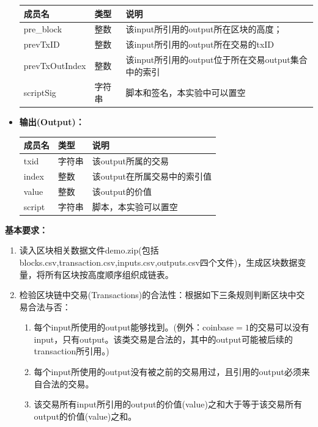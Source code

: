 \documentclass[10pt,a4paper]{article}
\begin{document}
\begin{itemize}
        \begin{table}[H]
            \centering
            \begin{tabular}{|l|l|l|}
            \hline
                成员名 & 类型 & 说明 \\ \hline
                pre\_block & 整数 & 该input所引用的output所在区块的高度；  \\ \hline
                prevTxID & 整数 & 该input所引用的output所在交易的txID \\ \hline
                prevTxOutIndex & 整数 & 该input所引用的output位于所在交易output集合中的索引 \\ \hline
                scriptSig & 字符串 & 脚本和签名，本实验中可以置空 \\ \hline
            \end{tabular}
        \end{table}
        \item \textbf{输出(Output)：}
        \begin{table}[H]
            \centering
            \begin{tabular}{|l|l|l|}
            \hline
                成员名 & 类型 & 说明 \\ \hline
                txid & 字符串 & 该output所属的交易 \\ \hline
                index & 整数 & 该output在所属交易中的索引值 \\ \hline
                value & 整数 & 该output的价值 \\ \hline
                script & 字符串 & 脚本，本实验可以置空 \\ \hline
            \end{tabular}
        \end{table}
    \end{itemize}
    \noindent \textbf{基本要求：}
    \begin{enumerate}
        \item 读入区块相关数据文件demo.zip(包括blocks.csv,transaction.csv,inputs.csv,outputs.csv四个文件)，生成区块数据变量，将所有区块按高度顺序组织成链表。
        \item 检验区块链中交易(Transactions)的合法性：根据如下三条规则判断区块中交易合法与否：
        \begin{enumerate}
            \item 每个input所使用的output能够找到。(例外：coinbase$=1$的交易可以没有input，只有output。该类交易是合法的，其中的output可能被后续的transaction所引用。)
            \item 每个input所使用的output没有被之前的交易用过，且引用的output必须来自合法的交易。
            \item 该交易所有input所引用的output的价值(value)之和大于等于该交易所有output的价值(value)之和。
        \end{enumerate}
    \end{enumerate}
\end{document}
